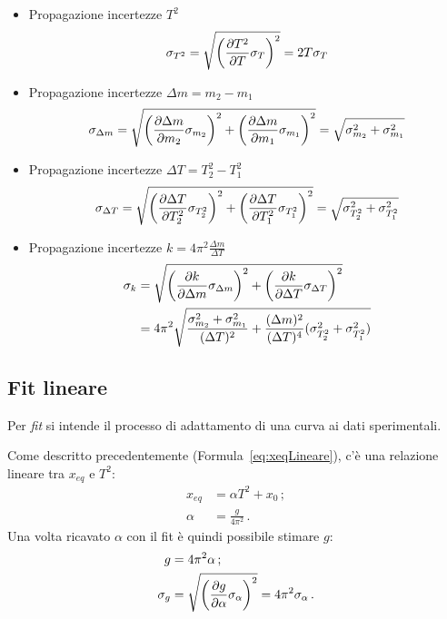 \documentclass[titlepage]{article}
\numberwithin{equation}{section}
\numberwithin{figure}{section}
\numberwithin{table}{section}
\begin{document}
\begin{itemize}
  \item Propagazione incertezze $T^2$
    \begin{equation}
      \sigma_{T^2} = \sqrt{\left( \diffp{T^2}{T} \sigma_T \right)^2} = 2 T \sigma_T
    \end{equation}

  \item Propagazione incertezze $\Delta m = m_2 - m_1$
    \begin{equation}
      \sigma_{\Delta m} = \sqrt{\left( \diffp{\Delta m}{m_2} \sigma_{m_2} \right)^2 + \left( \diffp{\Delta m}{m_1} \sigma_{m_1} \right)^2}
      = \sqrt{\sigma_{m_2}^2 + \sigma_{m_1}^2}
    \end{equation}

  \item Propagazione incertezze $\Delta T = T^2_2 - T^2_1$
    \begin{equation}
      \sigma_{\Delta T} = \sqrt{\left( \diffp{\Delta T}{T^2_2} \sigma_{T^2_2} \right)^2 + \left( \diffp{\Delta T}{T^2_1} \sigma_{T^2_1} \right)^2}
      = \sqrt{\sigma_{T^2_2}^2 + \sigma_{T^2_1}^2}
    \end{equation}

  \item Propagazione incertezze $k = 4 \pi^2 \frac{\Delta m}{\Delta T}$
    \begin{align}
      \sigma_k &= \sqrt{\left( \diffp{k}{\Delta m} \sigma_{\Delta m} \right)^2 + \left( \diffp{k}{\Delta T} \sigma_{\Delta T} \right)^2} \nonumber \\
      &= 4 \pi^2 \sqrt{\frac{\sigma_{m_2}^2 + \sigma_{m_1}^2}{(\Delta T)^2} + \frac{(\Delta m)^2}{(\Delta T)^4} (\sigma_{T^2_2}^2 + \sigma_{T^2_1}^2)}
    \end{align}
\end{itemize}

\subsection{Fit lineare}

Per \textit{fit} si intende il processo di adattamento di una curva ai dati sperimentali.

\bigskip

\noindent
Come descritto precedentemente (Formula~\ref{eq:xeqLineare}), c'è una relazione lineare tra $x_{eq}$ e $T^2$:
\begin{align}
  x_{eq} &= \alpha T^2 + x_0 \,; \\
  \alpha &= \frac{g}{4 \pi^2} \,.
\end{align}
Una volta ricavato $\alpha$ con il fit è quindi possibile stimare $g$:
\begin{align}
  g &= 4 \pi^2 \alpha \,; \\
  \sigma_g &= \sqrt{\left( \diffp{g}{\alpha} \sigma_{\alpha} \right)^2} = 4 \pi^2 \sigma_{\alpha} \,.
\end{align}
\end{document}
